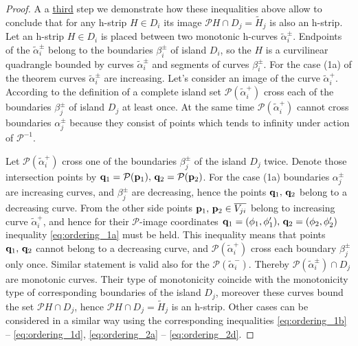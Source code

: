 \begin{proof}
	A a \underline{third} step we demonstrate how these inequalities above allow to conclude that for any h-strip $H \in D_i$ its image $\mathcal{P} H \cap D_j = \widetilde{H}_j$ is also an h-strip.
	Let an h-strip $H \in D_i$ is placed between two monotonic h-curves $\widetilde{\alpha}_i^{\pm}$.
	Endpoints of the $\widetilde{\alpha}_i^{\pm}$ belong to the boundaries $\beta_i^{\pm}$ of island $D_i$, so the $H$ is a curvilinear quadrangle bounded by curves $\widetilde{\alpha}_i^{\pm}$ and segments of curves $\beta_i^{\pm}$.
	For the case (1a) of the theorem curves $\widetilde{\alpha}_i^{\pm}$  are increasing.
	Let's consider an image of the curve $\widetilde{\alpha}_i^+$.
	According to the definition of a complete island set $\mathcal{P} (\widetilde{\alpha}_i^+)$ cross each of the boundaries $\beta_j^{\pm}$ of island $D_j$ at least once.
	At the same time $\mathcal{P} (\widetilde{\alpha}_i^+)$ cannot cross boundaries $\alpha_j^{\pm}$ because they consist of points which tends to infinity under action of $\mathcal{P}^{-1}$.
	
	Let $\mathcal{P} (\widetilde{\alpha}_i^+)$ cross one of the boundaries $\beta_j^{\pm}$ of the island $D_j$ twice.
	Denote those intersection points by $\vb{q}_1 = \mathcal{P}(\vb{p}_1), \, \vb{q}_2 = \mathcal{P}(\vb{p}_2)$.
	For the case (1a) boundaries $\alpha_j^{\pm}$ are increasing curves, and $\beta_j^{\pm}$ are decreasing, hence the points $\vb{q}_1, \, \vb{q}_2$ belong to a decreasing curve.
	From the other side points $\vb{p}_1, \, \vb{p}_2 \in \overline{V_{ji}}$ belong to increasing curve $\widetilde{\alpha}_i^+$, and hence for their $\mathcal{P}$-image coordinates $\vb{q}_1 = (\phi_1, \phi_1'), \, \vb{q}_2 = (\phi_2, \phi_2')$ inequality \eqref{eq:ordering_1a} must be held.
	This inequality means that points $\vb{q}_1, \, \vb{q}_2$ cannot belong to a decreasing curve, and $\mathcal{P} (\widetilde{\alpha}_i^+)$ cross each boundary $\beta_j^{\pm}$ only once.
	Similar statement is valid also for the $\mathcal{P} (\widetilde{\alpha}_i^-)$.
	Thereby $\mathcal{P} (\widetilde{\alpha}_i^{\pm}) \cap D_j$ are monotonic curves.
	Their type of monotonicity coincide with the monotonicity type of corresponding boundaries of the island $D_j$, moreover these curves bound the set $\mathcal{P} H \cap D_j$, hence $\mathcal{P} H \cap D_j = \widetilde{H}_j$ is an h-strip.
	Other cases can be considered in a similar way using the corresponding inequalities \eqref{eq:ordering_1b} -- \eqref{eq:ordering_1d}, \eqref{eq:ordering_2a} -- \eqref{eq:ordering_2d}.
	

\end{proof}
